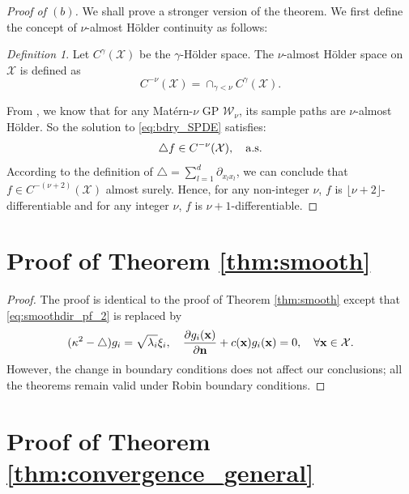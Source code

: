 \documentclass[aos,preprint]{imsart}
\theoremstyle{plain}
\newcommand{\CalX}{\mathcal X}
\newcommand{\Bx}{\bold x}
\newcommand{\BFx}{\bold x}
\newcommand{\CalW}{\mathcal{W}}
\theoremstyle{remark}
\newtheorem{definition}[theorem]{Definition}
\begin{document}
\begin{appendix}
\begin{proof}[Proof of ${(b)}$] 
    We shall prove a stronger version of the theorem. We first define the concept of $\nu$-almost H\"older continuity as follows:
    \begin{definition}
        Let $C^\gamma(\CalX)$ be the $\gamma$-H\"older space. The $\nu$-almost H\"older space on $\CalX$ is defined as
        \[C^{-\nu}(\CalX)=\cap_{\gamma<\nu}C^{\gamma}(\CalX).\]
    \end{definition}
    From \cite[Proposition 10]{da2023sample}, we know that for any Mat\'ern-$\nu$ GP $\CalW_\nu$, its sample paths are $\nu$-almost H\"older. So the solution to \eqref{eq:bdry_SPDE} satisfies:
    \[\bigtriangleup f\in C^{-\nu}(\CalX),\quad {\rm a.s.}\]
    According to the definition of $\bigtriangleup=\sum_{l=1}^d\partial_{x_lx_l}$, we can conclude that $f\in C^{-(\nu+2)}(\CalX)$ almost surely. Hence, for any non-integer $\nu$, $f$ is $\lfloor\nu+2\rfloor$-differentiable and for any integer $\nu$, $f$ is $\nu+1$-differentiable.
\end{proof}


\section{Proof of Theorem \ref{thm:smooth}}
\label{pf:smoothrobin}
\begin{proof}
    The proof is identical to the proof of Theorem \ref{thm:smooth} except that \eqref{eq:smoothdir_pf_2} is replaced by
    \begin{equation}
    \label{eq:smooth_pf_1}
    (\kappa^2-\bigtriangleup)g_i=\sqrt{\lambda_i}\xi_i,  \quad \frac{\partial g_i(\Bx)}{\partial \bold{n}}+c(\mathbf{x})g_i(\Bx)=0, \quad \forall\BFx\in\CalX. 
\end{equation}
However, the change in boundary conditions does not affect our conclusions; all the theorems remain valid under Robin boundary conditions.
    
\end{proof}



\section{Proof of Theorem \ref{thm:convergence_general}}
\label{pf:convergence_general}


\end{appendix}
\end{document}
